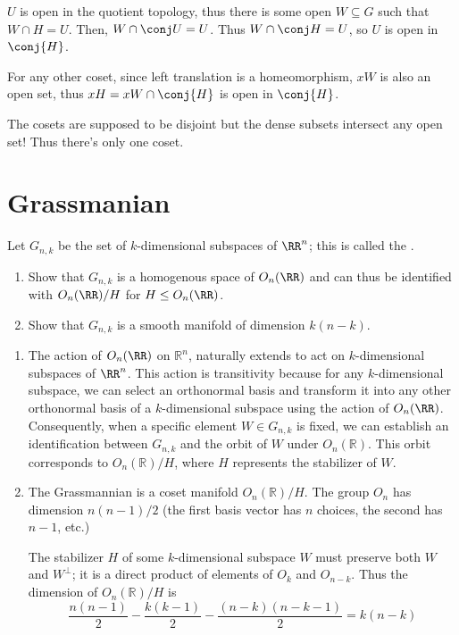 \documentclass[11pt, headheight=30pt]{scrartcl}
\begin{document}
\begin{walk}
    $U$ is open in the quotient topology, thus there is some open
    $W\subseteq G$ such that $W\cap H = U$. Then, $W \cap \conj U=U$.
    Thus $W \cap \conj H = U$, so $U$ is open in $\conj{H}$.

    
    For any other coset, since left translation is a homeomorphism,
    $xW$ is also an open set, thus $xH = xW\cap \conj{H}$ is open
    in $\conj{H}$.

    \item The cosets are supposed to be disjoint but the dense subsets
    intersect any open set! Thus there's only one coset.
\end{walk}

\newpage

\section{Grassmanian}
\begin{prob}
    Let $G_{n,k}$ be the set of $k$-dimensional subspaces of $\RR^n$;
    this is called the .

    \begin{enumerate}
        \item Show that $G_{n,k}$ is a homogenous space of $O_n(\RR)$
        and can thus be identified with $O_n(\RR)/H$ for $H \leq O_n(\RR)$.
        \item Show that $G_{n,k}$ is a smooth manifold of dimension $k(n-k)$.
    \end{enumerate}
\end{prob}
\begin{enumerate}
    \item The action of $O_n(\RR)$ on $\mathbb R^n$,
    naturally extends to act on $k$-dimensional subspaces of $\RR^n$.
    This action is transitivity because for any $k$-dimensional
    subspace, we can select an orthonormal basis and transform
    it into any other orthonormal basis of a $k$-dimensional
    subspace using the action of $O_n(\RR)$. Consequently,
    when a specific element $W \in G_{n,k}$ is fixed, we can
    establish an identification between $G_{n,k}$ and the orbit
    of $W$ under $O_n(\mathbb R)$. This orbit corresponds to
    $O_n(\mathbb R)/H$, where $H$ represents the stabilizer of $W$.

    \item The Grassmannian is a coset manifold $O_n(\mathbb R)/H$.
    The group $O_n$ has dimension $n(n-1)/2$ (the first basis vector
    has $n$ choices, the second has $n-1$, etc.)
    
    The stabilizer $H$ of some $k$-dimensional
    subspace $W$ must preserve both $W$ and $W^\perp$;
    it is a direct product of elements of $O_k$ and $O_{n-k}$.
    Thus the dimension of $O_n(\mathbb R)/H$ is
    \[
        \frac{n(n-1)}{2}-\frac{k(k-1)}{2}-\frac{(n-k)(n-k-1)}{2} = k(n-k)
    \]
\end{enumerate}
\end{document}
